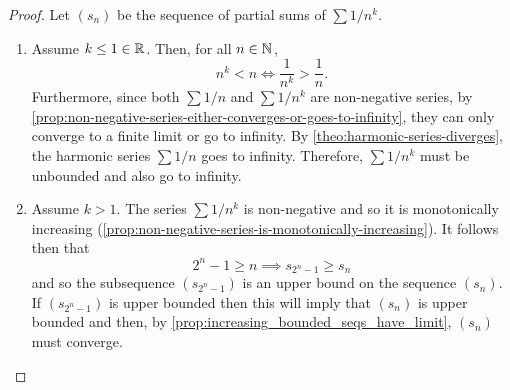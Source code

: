 \documentclass[../MathsNotesBase.tex]{subfiles}
\begin{document}
{		\bigskip
		\begin{proof}\nl
			Let $(s_n)$ be the sequence of partial sums of ${ \sum 1/n^k }$.
			\begin{enumerate}[label=(\roman*)]
				\item Assume ${ k \leq 1 \in \mathbb{R}^{} }$. Then, for all ${ n \in \mathbb{N}^{} }$,
				\[ n^k < n \iff \frac{1}{n^k} > \frac{1}{n}. \]
				Furthermore, since both ${ \sum 1/n }$ and ${ \sum 1/n^k }$ are non-negative series, by \autoref{prop:non-negative-series-either-converges-or-goes-to-infinity}, they can only converge to a finite limit or go to infinity. By \autoref{theo:harmonic-series-diverges}, the harmonic series ${ \sum 1/n }$ goes to infinity. Therefore, ${ \sum 1/n^k }$ must be unbounded and also go to infinity.
				
				\bigskip
				\item Assume ${ k > 1 }$. The series ${ \sum 1/n^k }$ is non-negative and so it is monotonically increasing (\autoref{prop:non-negative-series-is-monotonically-increasing}). It follows then that
				 \[ 2^n - 1 \geq n \implies s_{2^n - 1} \geq s_n \]
				 and so the subsequence $(s_{2^n - 1})$ is an upper bound on the sequence $(s_n)$. If $(s_{2^n - 1})$ is upper bounded then this will imply that $(s_n)$ is upper bounded and then, by \autoref{prop:increasing_bounded_seqs_have_limit}, $(s_n)$ must converge.\\
				 

\end{enumerate}
\end{proof}}
\end{document}
